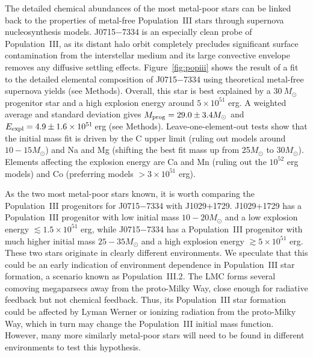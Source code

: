 \documentclass{natureprintstyle}
\newcommand{\umpstar}{J0715$-$7334\xspace}
\newcommand{\caffaustar}{J1029$+$1729\xspace}
\begin{document}
The detailed chemical abundances of the most metal-poor stars can be linked back to the properties of metal-free Population~III stars through supernova nucleosynthesis models\cite{Bromm2009,Frebel2015,Klessen2023}. \umpstar is an especially clean probe of Population~III, as its distant halo orbit completely precludes significant surface contamination from the interstellar medium\cite{Frebel2009,Shen2017} and its large convective envelope removes any diffusive settling effects. Figure~\ref{fig:popiii} shows the result of a fit to the detailed elemental composition of \umpstar using theoretical metal-free supernova yields\cite{Heger2010} (see Methods). Overall, this star is best explained by a $30~M_\odot$ progenitor star and a high explosion energy around $5 \times 10^{51}$ erg.
A weighted average and standard deviation gives $M_{\rm prog} = 29.0 \pm 3.4 M_\odot$ and $E_{\rm expl} = 4.9 \pm 1.6 \times 10^{51}$\,erg (see Methods).
Leave-one-element-out tests show that the initial mass fit is driven by the C upper limit (ruling out models around $10-15 M_\odot$) and Na and Mg (shifting the best fit mass up from 25$M_\odot$ to 30$M_\odot$). Elements affecting the explosion energy are Ca and Mn (ruling out the $10^{52}$ erg models) and Co (preferring models $>3 \times 10^{51}$ erg).

As the two most metal-poor stars known, it is worth comparing the Population~III progenitors for \umpstar with \caffaustar. 
\caffaustar has a Population~III progenitor with low initial mass $10-20 M_\odot$\cite{Lagae2023} and a low explosion energy ${\lesssim} 1.5 \times 10^{51}$ erg, while 
\umpstar has a Population~III progenitor with much higher initial mass $25-35 M_\odot$ and a high explosion energy ${\gtrsim} 5 \times 10^{51}$ erg.
These two stars originate in clearly different environments.
We speculate that this could be an early indication of environment dependence in Population~III star formation, a scenario known as Population~III.2\cite{Johnson2006,McKee2008}.
The LMC forms several comoving megaparsecs away from the proto-Milky Way\cite{Chiti2024}, close enough for radiative feedback but not chemical feedback\cite{Madau2001}. 
Thus, its Population~III star formation could be affected by Lyman Werner or ionizing radiation from the proto-Milky Way, which in turn may change the Population~III initial mass function\cite{Bromm2009,Clark2011,Klessen2023}.
However, many more similarly metal-poor stars will need to be found in different environments to test this hypothesis.
\end{document}
